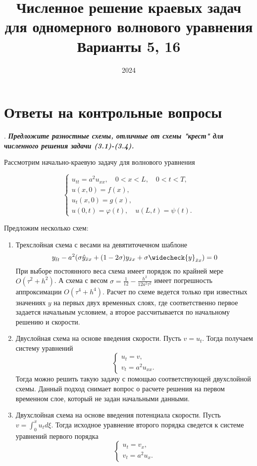 \documentclass[12pt, a4paper]{article}
\title{Численное решение краевых задач
	для одномерного волнового уравнения \\ Варианты 5, 16}
\date{2024}
\renewcommand{\phi}{\varphi}
\newcounter{mycounter}
\newcommand{\quastion}[1]{%
	\stepcounter{mycounter}%
	\textbf{\themycounter}.  %
	\textbf{\textit{#1}}
	
}
\begin{document}
	\maketitle
	\section{Ответы на контрольные вопросы}
	
	\quastion{Предложите разностные схемы, отличные от схемы "крест" для численного решения задачи (3.1)-(3.4).}
	
	Рассмотрим начально-краевую задачу для волнового уравнения
	
	\begin{equation}
		\begin{cases}
			u_{tt} = a^2 u_{xx}, \quad 0<x<L, \quad 0<t<T, \\
			u(x, 0) = f(x), \\
			u_t(x, 0) = g(x), \\
			u(0,t)=\phi(t), \quad u(L,t) = \psi(t).
		\end{cases}
	\end{equation}
	
	Предложим несколько схем:
	\begin{enumerate}
		\item Трехслойная схема с весами на девятиточечном шаблоне 
		\begin{equation*}
				y_{\bar{t}t} - a^2 (\sigma \hat{y}_{\bar{x}x} + (1 - 2 \sigma) y_{\bar{x}x} + \sigma \widecheck{y}_{\bar{x}x}) = 0
		\end{equation*}
		При выборе постоянного веса схема имеет порядок по крайней мере $O(\tau^2 + h^2)$. А схема с весом $\sigma = \frac{1}{12} - \frac{h^2}{12a^2\tau^2}$ имеет погрешность аппроксимации $O(\tau^4 + h^4)$. Расчет по схеме ведется только при известных значениях $y$ на первых двух временных слоях, где соответственно первое задается начальным условием, а второе рассчитывается по начальному решению и скорости.
		
		\item Двуслойная схема на основе введения скорости. Пусть $v = u_t$. Тогда получаем систему уравнений
		\begin{equation}
			\begin{cases}
				u_t = v,\\
				v_t = a^2 u_{xx}.
			\end{cases}
		\end{equation}
		Тогда можно решить такую задачу с помощью соответствующей двухслойной схемы. Данный подход снимает вопрос о расчете решения на первом временном слое, который не задан начальными данными.
		
		\item Двухслойная схема на основе введения потенциала скорости. Пусть $v = \int_{0}^{x} u_t d\xi$. Тогда исходное уравнение второго порядка сведется к системе уравнений первого порядка
		\begin{equation}
			\begin{cases}
				u_t = v_x,\\
				v_t = a^2 u_x.
			\end{cases}
		\end{equation}
	\end{enumerate}
			
\end{document}
